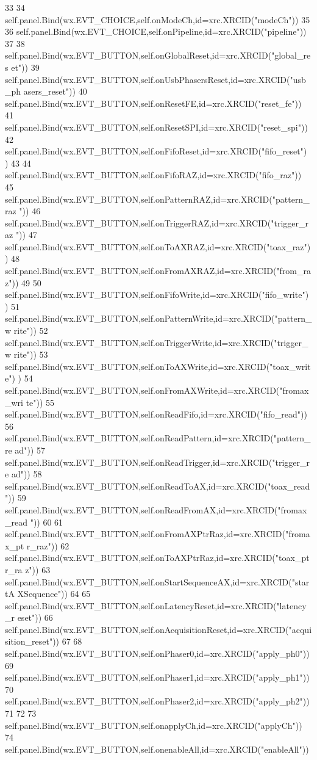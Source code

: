 \begin{DoxyCode}
33 
34         self.panel.Bind(wx.EVT_CHOICE,self.onModeCh,id=xrc.XRCID("modeCh"))
35 
36         self.panel.Bind(wx.EVT_CHOICE,self.onPipeline,id=xrc.XRCID("pipeline"))
37 
38         self.panel.Bind(wx.EVT_BUTTON,self.onGlobalReset,id=xrc.XRCID("global_res
      et"))
39         self.panel.Bind(wx.EVT_BUTTON,self.onUsbPhasersReset,id=xrc.XRCID("usb_ph
      asers_reset"))
40         self.panel.Bind(wx.EVT_BUTTON,self.onResetFE,id=xrc.XRCID("reset_fe"))
41         self.panel.Bind(wx.EVT_BUTTON,self.onResetSPI,id=xrc.XRCID("reset_spi"))
42         self.panel.Bind(wx.EVT_BUTTON,self.onFifoReset,id=xrc.XRCID("fifo_reset")
      )
43 
44         self.panel.Bind(wx.EVT_BUTTON,self.onFifoRAZ,id=xrc.XRCID("fifo_raz"))
45         self.panel.Bind(wx.EVT_BUTTON,self.onPatternRAZ,id=xrc.XRCID("pattern_raz
      "))
46         self.panel.Bind(wx.EVT_BUTTON,self.onTriggerRAZ,id=xrc.XRCID("trigger_raz
      "))
47         self.panel.Bind(wx.EVT_BUTTON,self.onToAXRAZ,id=xrc.XRCID("toax_raz"))
48         self.panel.Bind(wx.EVT_BUTTON,self.onFromAXRAZ,id=xrc.XRCID("from_raz"))
49         
50         self.panel.Bind(wx.EVT_BUTTON,self.onFifoWrite,id=xrc.XRCID("fifo_write")
      )
51         self.panel.Bind(wx.EVT_BUTTON,self.onPatternWrite,id=xrc.XRCID("pattern_w
      rite"))
52         self.panel.Bind(wx.EVT_BUTTON,self.onTriggerWrite,id=xrc.XRCID("trigger_w
      rite"))
53         self.panel.Bind(wx.EVT_BUTTON,self.onToAXWrite,id=xrc.XRCID("toax_write")
      )
54         self.panel.Bind(wx.EVT_BUTTON,self.onFromAXWrite,id=xrc.XRCID("fromax_wri
      te"))
55         self.panel.Bind(wx.EVT_BUTTON,self.onReadFifo,id=xrc.XRCID("fifo_read"))
56         self.panel.Bind(wx.EVT_BUTTON,self.onReadPattern,id=xrc.XRCID("pattern_re
      ad"))
57         self.panel.Bind(wx.EVT_BUTTON,self.onReadTrigger,id=xrc.XRCID("trigger_re
      ad"))
58         self.panel.Bind(wx.EVT_BUTTON,self.onReadToAX,id=xrc.XRCID("toax_read"))
59         self.panel.Bind(wx.EVT_BUTTON,self.onReadFromAX,id=xrc.XRCID("fromax_read
      "))
60 
61         self.panel.Bind(wx.EVT_BUTTON,self.onFromAXPtrRaz,id=xrc.XRCID("fromax_pt
      r_raz"))
62         self.panel.Bind(wx.EVT_BUTTON,self.onToAXPtrRaz,id=xrc.XRCID("toax_ptr_ra
      z"))
63         self.panel.Bind(wx.EVT_BUTTON,self.onStartSequenceAX,id=xrc.XRCID("startA
      XSequence"))
64 
65         self.panel.Bind(wx.EVT_BUTTON,self.onLatencyReset,id=xrc.XRCID("latency_r
      eset"))
66         self.panel.Bind(wx.EVT_BUTTON,self.onAcquisitionReset,id=xrc.XRCID("acqui
      sition_reset"))
67 
68         self.panel.Bind(wx.EVT_BUTTON,self.onPhaser0,id=xrc.XRCID("apply_ph0"))
69         self.panel.Bind(wx.EVT_BUTTON,self.onPhaser1,id=xrc.XRCID("apply_ph1"))
70         self.panel.Bind(wx.EVT_BUTTON,self.onPhaser2,id=xrc.XRCID("apply_ph2"))
71 
72         
73         self.panel.Bind(wx.EVT_BUTTON,self.onapplyCh,id=xrc.XRCID("applyCh"))
74         self.panel.Bind(wx.EVT_BUTTON,self.onenableAll,id=xrc.XRCID("enableAll"))
      

\end{DoxyCode}
